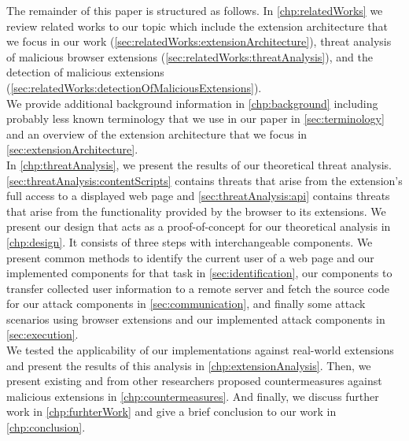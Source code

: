	The remainder of this paper is structured as follows. In \autoref{chp:relatedWorks} we review related works to our topic which include the extension architecture that we focus in our work (\autoref{sec:relatedWorks:extensionArchitecture}), threat analysis of malicious browser extensions (\autoref{sec:relatedWorks:threatAnalysis}), and the detection of malicious extensions (\autoref{sec:relatedWorks:detectionOfMaliciousExtensions}). \\
	We provide additional background information in \autoref{chp:background} including probably less known terminology that we use in our paper in \autoref{sec:terminology} and an overview of the extension architecture that we focus in \autoref{sec:extensionArchitecture}. \\
	In \autoref{chp:threatAnalysis}, we present the results of our theoretical threat analysis. \autoref{sec:threatAnalysis:contentScripts} contains threats that arise from the extension's full access to a displayed web page and \autoref{sec:threatAnalysis:api} contains threats that arise from the functionality provided by the browser to its extensions.
	We present our design that acts as a proof-of-concept for our theoretical analysis in \autoref{chp:design}. It consists of three steps with interchangeable components. We present common methods to identify the current user of a web page and our implemented components for that task in \autoref{sec:identification}, our components to transfer collected user information to a remote server and fetch the source code for our attack components in \autoref{sec:communication}, and finally some attack scenarios using browser extensions and our implemented attack components in \autoref{sec:execution}. \\
	We tested the applicability of our implementations against real-world extensions and present the results of this analysis in \autoref{chp:extensionAnalysis}.
	Then, we present existing and from other researchers proposed countermeasures against malicious extensions in \autoref{chp:countermeasures}.
	And finally, we discuss further work in \autoref{chp:furhterWork} and give a brief conclusion to our work in \autoref{chp:conclusion}.